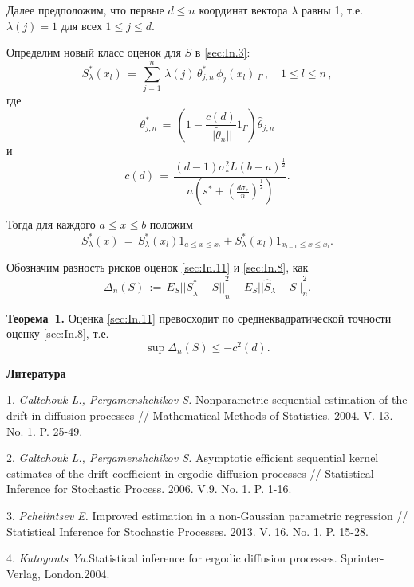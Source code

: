 Далее предположим, что первые $d \leqslant  n$ координат вектора $\lambda$ равны 1, т.е. $\lambda(j)=1$ для всех $1 \leqslant j \leqslant d$.

Определим новый класс оценок для $S$ в \eqref{sec:In.3}:
\begin{equation}\label{sec:In.8}
 {{S}}^*_{\lambda}(x_{l})\,=\,\sum^n_{j=1}\,\lambda(j)\,{\theta}^*_{j,n}\,\phi_{j}(x_{l})\,
_{\Gamma}\,,\quad 1\leqslant l\leqslant n\,,
\end{equation}
где
\begin{equation}\label{sec:In.9}
{\theta}^*_{j,n}\,=\,\left( 1-\frac{c(d)}{||\widetilde{\theta}_{n}||}
1_{\Gamma} \right)\hat {\theta}_{j,n}
\end{equation}
и
\begin{equation}\label{sec:In.10}
c(d)\,=\,\frac{(d-1){\sigma}^2_*L(b-a)^{\frac{1}{2}}}{n(s^*+({\frac {d \sigma_*}{n} })^{\frac{1}{2}})}.
\end{equation}

Тогда для каждого $a \leqslant x \leqslant b$  положим
\begin{equation}\label{sec:In.11}
{{S}}^*_{\lambda}(x)\,=\,{{S}}^*_{\lambda}(x_{l}) 1_{a \leqslant x \leqslant  x_{l}}
+{{S}}^*_{\lambda}(x_{l}) 1_{x_{l-1} \leqslant x \leqslant  x_{l}}.
\end{equation}

Обозначим разность рисков оценок \eqref{sec:In.11} и \eqref{sec:In.8}, как
 \begin{equation}\label{sec:In.12}
\Delta_n (S)\,:=\,E_S {{||{S}}^*_{\lambda}-S||}^2 _n -E_S {||\hat {{S}}_{\lambda}-S||}^2 _n.
\end{equation}

\textbf{Теорема~1.}
Оценка \eqref{sec:In.11} превосходит по среднеквадратической точности оценку \eqref{sec:In.8}, т.е.
\begin{equation}
\sup \Delta_n (S) \leqslant -c^2 (d).
\end{equation}


\smallskip \centerline{\bf Литература}\nopagebreak

1. {\it Galtchouk L., Pergamenshchikov S.} Nonparametric sequential estimation of the drift in diffusion processes // Mathematical Methods of Statistics. 2004. V. 13. No. 1. P. 25-49.

2. {\it Galtchouk L., Pergamenshchikov S.} Asymptotic efficient sequential kernel estimates of the drift coefficient in ergodic diffusion processes // Statistical Inference for Stochastic Process. 2006. V.9. No. 1. P. 1-16.

3. {\it Pchelintsev E.} Improved estimation in a non-Gaussian parametric regression //
Statistical Inference for Stochastic Processes. 2013. V. 16. No. 1. P. 15-28.

4. {\it Kutoyants Yu.}Statistical inference for ergodic diffusion processes. Sprinter-Verlag, London.2004.


